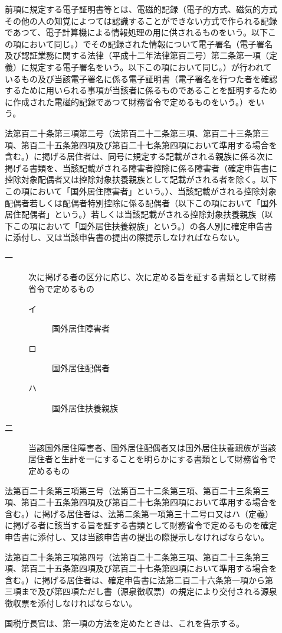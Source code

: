 \documentclass[twocolumn,a4j,10pt]{ltjtarticle}
\begin{document}
\begin{description}
\item[]前項に規定する電子証明書等とは、電磁的記録（電子的方式、磁気的方式その他の人の知覚によつては認識することができない方式で作られる記録であつて、電子計算機による情報処理の用に供されるものをいう。以下この項において同じ。）でその記録された情報について電子署名（電子署名及び認証業務に関する法律（平成十二年法律第百二号）第二条第一項（定義）に規定する電子署名をいう。以下この項において同じ。）が行われているもの及び当該電子署名に係る電子証明書（電子署名を行つた者を確認するために用いられる事項が当該者に係るものであることを証明するために作成された電磁的記録であつて財務省令で定めるものをいう。）をいう。
\item[]法第百二十条第三項第二号（法第百二十二条第三項、第百二十三条第三項、第百二十五条第四項及び第百二十七条第四項において準用する場合を含む。）に掲げる居住者は、同号に規定する記載がされる親族に係る次に掲げる書類を、当該記載がされる障害者控除に係る障害者（確定申告書に控除対象配偶者又は控除対象扶養親族として記載がされる者を除く。以下この項において「国外居住障害者」という。）、当該記載がされる控除対象配偶者若しくは配偶者特別控除に係る配偶者（以下この項において「国外居住配偶者」という。）若しくは当該記載がされる控除対象扶養親族（以下この項において「国外居住扶養親族」という。）の各人別に確定申告書に添付し、又は当該申告書の提出の際提示しなければならない。
\begin{description}
\item[一]次に掲げる者の区分に応じ、次に定める旨を証する書類として財務省令で定めるもの
\begin{description}
\item[イ]国外居住障害者
\item[ロ]国外居住配偶者
\item[ハ]国外居住扶養親族
\end{description}
\item[二]当該国外居住障害者、国外居住配偶者又は国外居住扶養親族が当該居住者と生計を一にすることを明らかにする書類として財務省令で定めるもの
\end{description}
\item[]法第百二十条第三項第三号（法第百二十二条第三項、第百二十三条第三項、第百二十五条第四項及び第百二十七条第四項において準用する場合を含む。）に掲げる居住者は、法第二条第一項第三十二号ロ又はハ（定義）に掲げる者に該当する旨を証する書類として財務省令で定めるものを確定申告書に添付し、又は当該申告書の提出の際提示しなければならない。
\item[]法第百二十条第三項第四号（法第百二十二条第三項、第百二十三条第三項、第百二十五条第四項及び第百二十七条第四項において準用する場合を含む。）に掲げる居住者は、確定申告書に法第二百二十六条第一項から第三項まで及び第四項ただし書（源泉徴収票）の規定により交付される源泉徴収票を添付しなければならない。
\item[]国税庁長官は、第一項の方法を定めたときは、これを告示する。
\end{description}
\end{document}
